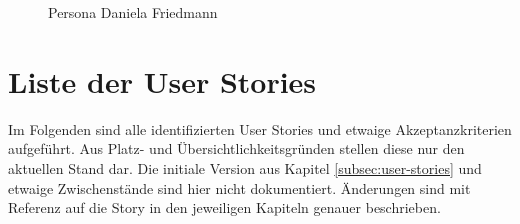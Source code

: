 \begin{figure}[!htb]
    \centering
    \caption{Persona Daniela Friedmann}
    \label{fig:daniela-friedmann}
\end{figure}

\section{Liste der User Stories}
\label{sec:anhang-user-stories}
Im Folgenden sind alle identifizierten User Stories und etwaige Akzeptanzkriterien aufgeführt. Aus Platz- und Übersichtlichkeitsgründen stellen diese nur den aktuellen Stand dar. Die initiale Version aus Kapitel \ref{subsec:user-stories} und etwaige Zwischenstände sind hier nicht dokumentiert. Änderungen sind mit Referenz auf die Story in den jeweiligen Kapiteln genauer beschrieben.

